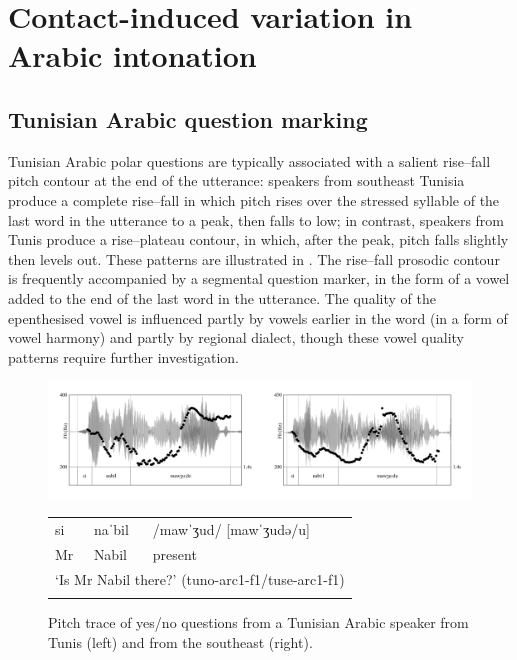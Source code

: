 \documentclass[output=paper]{langsci/langscibook}
\begin{document}
 \section{Contact-induced variation in Arabic intonation} \label{araint}


 \subsection{Tunisian Arabic question marking} \label{tunis}


Tunisian Arabic polar questions are typically associated with a salient rise--fall pitch contour at the end of the utterance: speakers from southeast Tunisia produce a complete rise--fall in which pitch rises over the stressed syllable of the last word in the utterance to a peak, then falls to low; in contrast, speakers from Tunis produce a rise--plateau contour, in which, after the peak, pitch falls slightly then levels out. These patterns are illustrated in  \citep{BouchhiouaHellmuthAlmbark2019}. The rise--fall prosodic contour is frequently accompanied by a segmental question marker, in the form of a vowel added to the end of the last word in the utterance. The quality of the epenthesised vowel is influenced partly by vowels earlier in the word (in a form of vowel harmony) and partly by regional dialect, though these vowel quality patterns require further investigation.

  
\begin{figure}
\includegraphics[width=\textwidth]{figures/intonation-img1.png}
\caption{\label{fig:key:1}Pitch trace of yes/no questions from a Tunisian Arabic speaker from Tunis (left) and from the southeast (right).}

\begin{tabularx}{\textwidth}{llX}
\lsptoprule
si & naˈbil & /mawˈʒud/ [mawˈʒudə/u]\\
Mr & Nabil & present\\
\multicolumn{3}{l}{‘Is Mr Nabil there?’  (tuno-arc1-f1/tuse-arc1-f1)}\\
\lspbottomrule
\end{tabularx}
\end{figure}
\end{document}
